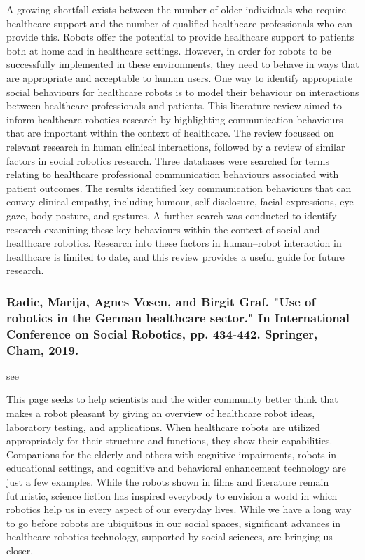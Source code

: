 \documentclass[conference]{IEEEtran}
\begin{document}
A growing shortfall exists between the number of older individuals who require healthcare support and the number of qualified healthcare professionals who can provide this. Robots offer the potential to provide healthcare support to patients both at home and in healthcare settings. However, in order for robots to be successfully implemented in these environments, they need to behave in ways that are appropriate and acceptable to human users. One way to identify appropriate social behaviours for healthcare robots is to model their behaviour on interactions between healthcare professionals and patients. This literature review aimed to inform healthcare robotics research by highlighting communication behaviours that are important within the context of healthcare. The review focussed on relevant research in human clinical interactions, followed by a review of similar factors in social robotics research. Three databases were searched for terms relating to healthcare professional communication behaviours associated with patient outcomes. The results identified key communication behaviours that can convey clinical empathy, including humour, self-disclosure, facial expressions, eye gaze, body posture, and gestures. A further search was conducted to identify research examining these key behaviours within the context of social and healthcare robotics. Research into these factors in human–robot interaction in healthcare is limited to date, and this review provides a useful guide for future research.

\medskip
\subsubsection{Radic, Marija, Agnes Vosen, and Birgit Graf. "Use of robotics in the German healthcare sector." In International Conference on Social Robotics, pp. 434-442. Springer, Cham, 2019.}
see \cite{radic2019use}

This page seeks to help scientists and the wider community better think that makes a robot pleasant by giving an overview of healthcare robot ideas, laboratory testing, and applications. When healthcare robots are utilized appropriately for their structure and functions, they show their capabilities. Companions for the elderly and others with cognitive impairments, robots in educational settings, and cognitive and behavioral enhancement technology are just a few examples. While the robots shown in films and literature remain futuristic, science fiction has inspired everybody to envision a world in which robotics help us in every aspect of our everyday lives. While we have a long way to go before robots are ubiquitous in our social spaces, significant advances in healthcare robotics technology, supported by social sciences, are bringing us closer.
\end{document}
